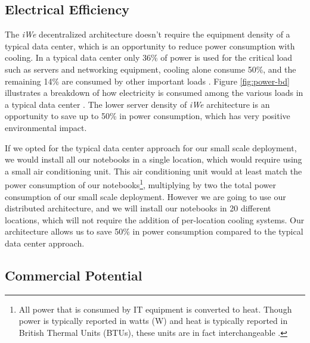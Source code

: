 \subsection{Electrical Efficiency} 
\label{subsec:ee}


The \textit{iWe} decentralized architecture doesn't require the equipment
density of a typical data center, which is an opportunity to reduce power
consumption with cooling. In a typical data center only 36\% of power is used
for the critical load such as servers and networking equipment, cooling alone
consume 50\%, and the remaining 14\% are consumed by other important loads
\cite{apc-dc-power}.  Figure \ref{fig:power-bd} illustrates a breakdown of how
electricity is consumed among the various loads in a typical data center
\cite{apc-dc-power}. The lower server density of \textit{iWe} architecture is
an opportunity to save up to 50\% in power consumption, which has very positive
environmental impact.

If we opted for the typical data center approach for our small scale deployment,
we would install all our notebooks in a single location, which would require
using a small air conditioning unit. This air conditioning unit would at least
match the power consumption of our notebooks\footnote{All power that is consumed
by IT equipment is converted to heat. Though power is typically reported in
watts (W) and heat is typically reported in British Thermal Units (BTUs), these
units are in fact interchangeable \cite{cisco-dc-power}.}, multiplying by two
the total power consumption of our small scale deployment. However we are going
to use our distributed architecture, and we will install our notebooks in 20
different locations, which will not require the addition of per-location cooling
systems.  Our architecture allows us to save 50\% in power consumption compared
to the typical data center approach.

\subsection{Commercial Potential}
\label{subsec:company}



